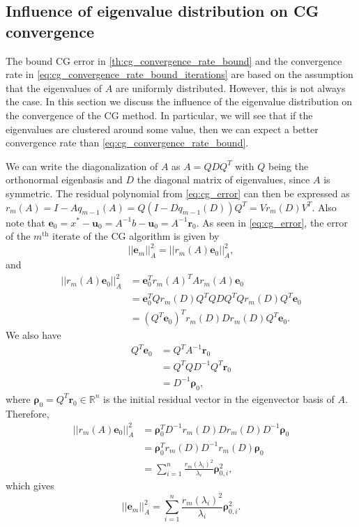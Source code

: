 \subsection{Influence of eigenvalue distribution on CG convergence}\label{sec:cg_eigenvalue_distribution}
The bound CG error in \cref{th:cg_convergence_rate_bound} and the convergence rate in \cref{eq:cg_convergence_rate_bound_iterations} are based on the assumption that the eigenvalues of $A$ are uniformly distributed. However, this is not always the case. In this section we discuss the influence of the eigenvalue distribution on the convergence of the CG method. In particular, we will see that if the eigenvalues are clustered around some value, then we can expect a better convergence rate than \cref{eq:cg_convergence_rate_bound}.

We can write the diagonalization of $A$ as $A = QDQ^T$ with $Q$ being the orthonormal eigenbasis and $D$ the diagonal matrix of eigenvalues, since $A$ is symmetric. The residual polynomial from \cref{eq:cg_error} can then be expressed as $r_m(A) = I - Aq_{m-1}(A) = Q(I - Dq_{m-1}(D))Q^T = Vr_m(D)V^T$. Also note that $\mathbf{e}_0 = x^* - \mathbf{u}_0 = A^{-1}b - \mathbf{u}_0 = A^{-1}\mathbf{r}_0$. As seen in \cref{eq:cg_error}, the error of the $m^{\text{th}}$ iterate of the CG algorithm is given by
\begin{equation*}
  ||\mathbf{e}_m||_A^2 = ||r_m(A)\mathbf{e}_0||_A^2,
\end{equation*}
and
\begin{align*}
  ||r_m(A)\mathbf{e}_0||_A^2 & = \mathbf{e}_0^T r_m(A)^T A r_m(A) \mathbf{e}_0                 \\
                            & = \mathbf{e}_0^T Q r_m(D) Q^T Q D Q^T Q r_m(D) Q^T \mathbf{e}_0 \\
                            & = (Q^T\mathbf{e}_0)^T r_m(D) D r_m(D) Q^T \mathbf{e}_0.
\end{align*}
We also have
\begin{align*}
  Q^T\mathbf{e}_0 & = Q^T A^{-1} \mathbf{r}_0       \\
                & = Q^T Q D^{-1} Q^T \mathbf{r}_0 \\
                & = D^{-1} \mathbf{\rho}_0,
\end{align*}
where $\mathbf{\rho}_0 = Q^T \mathbf{r}_0 \in \mathbb{R}^n$ is the initial residual vector in the eigenvector basis of $A$. Therefore,
\begin{align*}
  ||r_m(A)\mathbf{e}_0||_A^2 & = \mathbf{\rho}_0^T D^{-1} r_m(D) D r_m(D) D^{-1} \mathbf{\rho}_0                 \\
                           & = \mathbf{\rho}_0^T r_m(D) D^{-1} r_m(D)  \mathbf{\rho}_0                         \\
                           & = \sum_{i=1}^n \frac{r_m(\lambda_i)^2}{\lambda_i} \mathbf{\rho}_{0,i}^2,
\end{align*}
which gives
\begin{equation}
  ||\mathbf{e}_m||_A^2 = \sum_{i=1}^n \frac{r_m(\lambda_i)^2}{\lambda_i} \mathbf{\rho}_{0,i}^2.
  \label{eq:cg_error_eigenvalue}
\end{equation}

